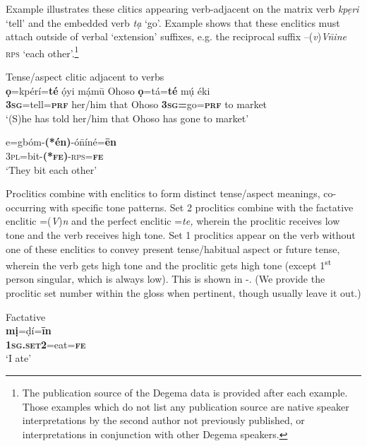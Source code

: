 \documentclass[output=paper]{langsci/langscibook}
\begin{document}
Example  illustrates these clitics appearing verb-adjacent on the matrix verb \textit{kpẹri} ‘tell’ and the embedded verb \textit{tạ} ‘go’. Example  shows that these enclitics must attach outside of verbal ‘extension’ suffixes, e.g. the reciprocal suffix –(\textit{v})\textit{V\={n}ine} \textsc{rps} ‘each other’.\footnote{The publication source of the Degema data is provided after each example. Those examples which do not list any publication source are native speaker interpretations by the second author not previously published, or interpretations in conjunction with other Degema speakers. 
}


\ea\label{ex:rolle:1}
{Tense/aspect clitic adjacent to verbs}\\
\gll   \textbf{ọ}=kpérí=\textbf{té}   ọ́yi     mạ́mū   Ohoso   \textbf{ọ}=tá=\textbf{té}     mụ́  éki\\
      \textbf{3}\textbf{\textsc{sg}}=tell=\textbf{\textsc{prf}}   her/him  that     Ohoso  \textbf{3}\textbf{\textsc{sg}}\textbf{=}go=\textbf{\textsc{prf}}  to  market\\
\glt   ‘(S)he has told her/him that Ohoso has gone to market’ \citep[63]{Kari2004}
\z


\ea\label{ex:rolle:2}
\gll   e=gbóm-\textbf{(*én)}{}-ó\={n}íné=\textbf{ēn}\\
       3\textsc{pl}=bit-\textbf{(*}\textbf{\textsc{fe}}\textbf{)}{}-\textsc{rps}=\textbf{\textsc{fe}}\\
\glt   ‘They bit each other’ \citep[149]{Kari2004}
\z

Proclitics combine with enclitics to form distinct tense/aspect meanings, co-occurring with specific tone patterns. Set 2 proclitics combine with the factative enclitic =(\textit{V})\textit{n} and the perfect enclitic =\textit{te,} wherein the proclitic receives low tone and the verb receives high tone. Set 1 proclitics appear on the verb without one of these enclitics to convey present tense/habitual aspect or future tense, wherein the verb gets high tone and the proclitic gets high tone (except 1\textsuperscript{st} person singular, which is always low). This is shown in -. (We provide the proclitic set number within the gloss when pertinent, though usually leave it out.)


\ea\label{ex:rolle:3}
Factative\\
\gll  \textbf{mị}=ḍí=\textbf{īn}\\
     \textbf{\textsc{1sg.set2}}=eat=\textbf{\textsc{fe}}\\
\glt ‘I ate’ \citep[44]{Kari1997}
\z
\end{document}
